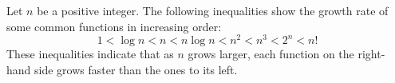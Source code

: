 \begin{theo}

    Let $n$ be a positive integer. The following inequalities show the growth rate of some common functions in increasing order:
    \LARGE
    \[
    1 < \log n < n < n \log n < n^2 < n^3 < 2^n < n!
    \]
    \normalsize
    These inequalities indicate that as $n$ grows larger, each function on the right-hand side grows faster than the ones to its left.
    
\end{theo}






